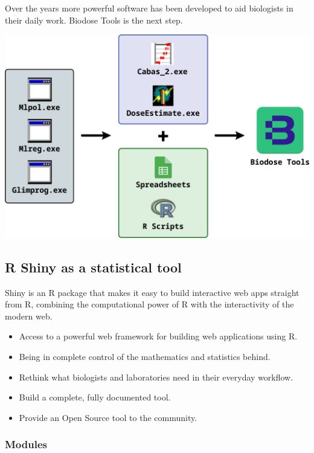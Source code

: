 \documentclass[]{scrartcl}
\begin{document}
Over the years more powerful software has been developed to aid biologists in their daily work. Biodose Tools is the next step.

\includegraphics{images/intro/chronology.pdf}

\hypertarget{r-shiny-as-a-statistical-tool}{%
\subsection*{R Shiny as a statistical tool}\label{r-shiny-as-a-statistical-tool}}

Shiny is an R package that makes it easy to build interactive web apps straight from R, combining the computational power of R with the interactivity of the modern web.

\begin{itemize}
\item
  Access to a powerful web framework for building web applications using R.
\item
  Being in complete control of the mathematics and statistics behind.
\item
  Rethink what biologists and laboratories need in their everyday workflow.
\item
  Build a complete, fully documented tool.
\item
  Provide an Open Source tool to the community.
\end{itemize}

\hypertarget{modules}{%
\subsubsection*{Modules}\label{modules}}
\end{document}
